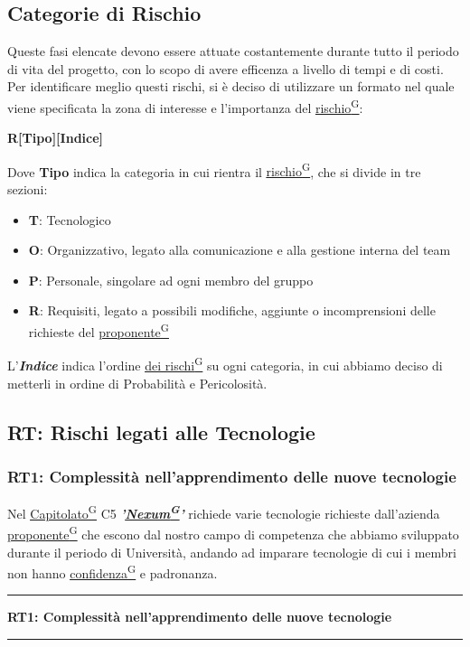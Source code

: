 \documentclass[a4paper,12pt]{article}
\providecommand{\glslink}[2]{\href{https://alittlebyte-19.github.io/Documentazione/glossario.html\#gls-#1}{\underline{#2}\textsuperscript{\scriptsize G}}}
\begin{document}
\subsection{Categorie di Rischio}
Queste fasi elencate devono essere attuate costantemente durante tutto il periodo di vita del progetto, con lo scopo di avere efficenza a livello di tempi e di costi.
Per identificare meglio questi rischi, si è deciso di utilizzare un formato nel quale viene specificata la zona di interesse e l'importanza del \glslink{rischio}{rischio}:
\begin{center}
    \textbf{R[Tipo][Indice]}
\end{center}
Dove \textbf{Tipo} indica la categoria in cui rientra il \glslink{rischio}{rischio}, che si divide in tre sezioni:
\begin{itemize}
    \item \textbf{T}: Tecnologico
    \item \textbf{O}: Organizzativo, legato alla comunicazione e alla gestione interna del team
    \item \textbf{P}: Personale, singolare ad ogni membro del gruppo
    \item \textbf{R}: Requisiti, legato a possibili modifiche, aggiunte o incomprensioni delle richieste del \glslink{committente-proponente}{proponente}
\end{itemize}
L'\textbf{\textit{Indice}} indica l'ordine \glslink{mitigazione-dei-rischi}{dei rischi} su ogni categoria, in cui abbiamo deciso di metterli in ordine di Probabilità e Pericolosità.

\newpage
\subsection{RT: Rischi legati alle Tecnologie}
\subsubsection{RT1: Complessità nell'apprendimento delle nuove tecnologie}
Nel \glslink{capitolato}{Capitolato} C5 \textbf{\textit{'\glslink{nexum}{Nexum}'}} richiede varie tecnologie richieste dall'azienda \glslink{committente-proponente}{proponente} che escono dal nostro campo di competenza che abbiamo sviluppato durante il periodo di Università, andando ad imparare tecnologie di cui i membri non hanno \glslink{confidenza-confidence-score}{confidenza} e padronanza.

\vspace{0.5cm}
\hrule
\vspace{0.5em}
\textbf{RT1: Complessità nell'apprendimento delle nuove tecnologie}
\vspace{0.5em}
\hrule
\vspace{1cm}
\end{document}
